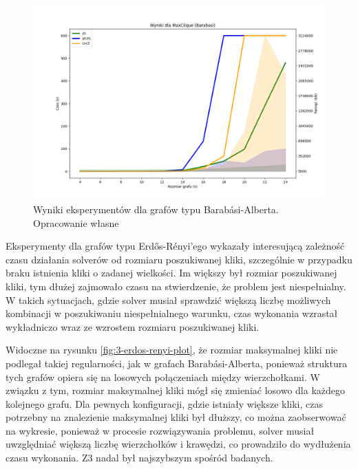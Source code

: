 \begin{figure}[htbp]
	\centering
	\begin{minipage}{\textwidth}
		\includegraphics[width=\textwidth]{./figures/3-barabasi-plot.png}
		\caption{Wyniki eksperymentów dla grafów typu Barabási-Alberta. Opracowanie własne}
		\label{fig:3-barabasi-plot}
	\end{minipage}
\end{figure}

Eksperymenty dla grafów typu Erdős-Rényi'ego wykazały interesującą zależność czasu działania solverów od rozmiaru poszukiwanej kliki, szczególnie w przypadku braku istnienia kliki o zadanej wielkości. Im większy był rozmiar poszukiwanej kliki, tym dłużej zajmowało czasu na stwierdzenie, że problem jest niespełnialny. W takich sytuacjach, gdzie solver musiał sprawdzić większą liczbę możliwych kombinacji w poszukiwaniu niespełnialnego warunku, czas wykonania wzrastał wykładniczo wraz ze wzrostem rozmiaru poszukiwanej kliki.

Widoczne na rysunku \ref{fig:3-erdos-renyi-plot}, że rozmiar maksymalnej kliki nie podlegał takiej regularności, jak w grafach Barabási-Alberta, ponieważ struktura tych grafów opiera się na losowych połączeniach między wierzchołkami. W związku z tym, rozmiar maksymalnej kliki mógł się zmieniać losowo dla każdego kolejnego grafu. Dla pewnych konfiguracji, gdzie istniały większe kliki, czas potrzebny na znalezienie maksymalnej kliki był dłuższy, co można zaobserwować na wykresie, ponieważ w procesie rozwiązywania problemu, solver musiał uwzględniać większą liczbę wierzchołków i krawędzi, co prowadziło do wydłużenia czasu wykonania. Z3 nadal był najszybszym spośród badanych.

